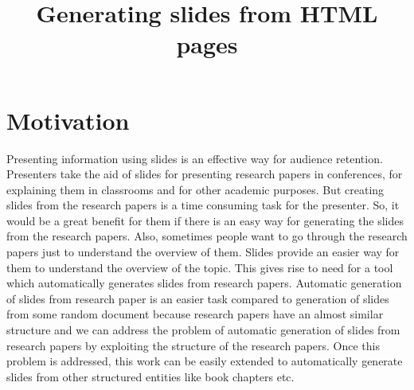 \documentclass[conference]{IEEEtran}
\begin{document}
%
\title{Generating slides from HTML pages}


\author{
\and
{}
\and
{}
}


\maketitle





\section{Motivation}
Presenting information using slides is an effective way for audience retention.
Presenters take the aid of slides for presenting research papers in conferences, for
explaining them in classrooms and for other academic purposes. But creating slides from
the research papers is a time consuming task for the presenter. So, it would be a great
benefit for them if there is an easy way for generating the slides from the research
papers. Also, sometimes people want to go through the research papers just to understand
the overview of them. Slides provide an easier way for them to understand the overview of
the topic. This gives rise to need for a tool which automatically generates slides from
research papers. Automatic generation of slides from research paper is an easier task
compared to generation of slides from some random document because research papers have
an almost similar structure and we can address the problem of automatic generation of slides
from research papers by exploiting the structure of the research papers. Once this problem
is addressed, this work can be easily extended to automatically generate slides from other
structured entities like book chapters etc.
\end{document}

